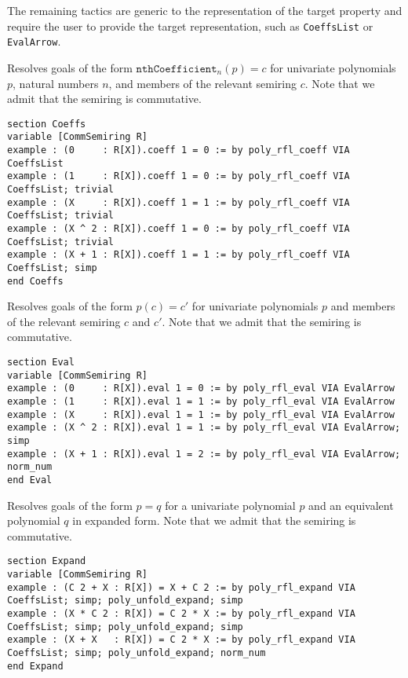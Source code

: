 The remaining tactics are generic to the representation of the target property and require the user to provide the target representation, such as \lstinline{CoeffsList} or \lstinline{EvalArrow}.

\begin{tactic}
\label{tac:poly_rfl_coeff}
\leanok
{}
Resolves goals of the form $\mathtt{nthCoefficient}_n(p) = c$ for univariate polynomials $p$, natural numbers $n$, and members of the relevant semiring $c$. Note that we admit that the semiring is commutative.
\begin{lstlisting}
section Coeffs
variable [CommSemiring R]
example : (0     : R[X]).coeff 1 = 0 := by poly_rfl_coeff VIA CoeffsList
example : (1     : R[X]).coeff 1 = 0 := by poly_rfl_coeff VIA CoeffsList; trivial
example : (X     : R[X]).coeff 1 = 1 := by poly_rfl_coeff VIA CoeffsList; trivial
example : (X ^ 2 : R[X]).coeff 1 = 0 := by poly_rfl_coeff VIA CoeffsList; trivial
example : (X + 1 : R[X]).coeff 1 = 1 := by poly_rfl_coeff VIA CoeffsList; simp
end Coeffs
\end{lstlisting}
\end{tactic}

\begin{tactic}
\label{tac:poly_rfl_eval}
\leanok
{}
Resolves goals of the form $p(c) = c'$ for univariate polynomials $p$ and members of the relevant semiring $c$ and $c'$. Note that we admit that the semiring is commutative.
\begin{lstlisting}
section Eval
variable [CommSemiring R]
example : (0     : R[X]).eval 1 = 0 := by poly_rfl_eval VIA EvalArrow
example : (1     : R[X]).eval 1 = 1 := by poly_rfl_eval VIA EvalArrow
example : (X     : R[X]).eval 1 = 1 := by poly_rfl_eval VIA EvalArrow
example : (X ^ 2 : R[X]).eval 1 = 1 := by poly_rfl_eval VIA EvalArrow; simp
example : (X + 1 : R[X]).eval 1 = 2 := by poly_rfl_eval VIA EvalArrow; norm_num
end Eval
\end{lstlisting}
\end{tactic}

\begin{tactic}
\label{tac:poly_rfl_expand}
\leanok
{}
Resolves goals of the form $p = q$ for a univariate polynomial $p$ and an equivalent polynomial $q$ in expanded form. Note that we admit that the semiring is commutative.
\begin{lstlisting}
section Expand
variable [CommSemiring R]
example : (C 2 + X : R[X]) = X + C 2 := by poly_rfl_expand VIA CoeffsList; simp; poly_unfold_expand; simp
example : (X * C 2 : R[X]) = C 2 * X := by poly_rfl_expand VIA CoeffsList; simp; poly_unfold_expand; simp
example : (X + X   : R[X]) = C 2 * X := by poly_rfl_expand VIA CoeffsList; simp; poly_unfold_expand; norm_num
end Expand
\end{lstlisting}
\end{tactic}

